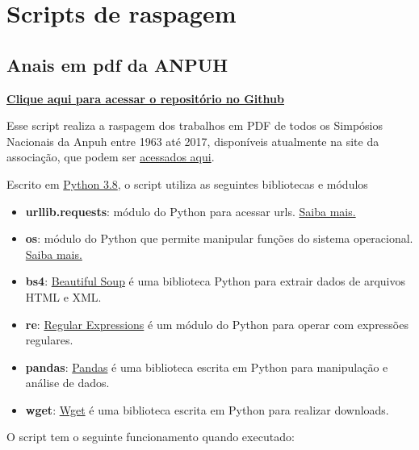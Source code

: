\documentclass[
]{book}
\providecommand{\tightlist}{%
  \setlength{\itemsep}{0pt}\setlength{\parskip}{0pt}}
\begin{document}
\hypertarget{scripts-de-raspagem}{%
\section{Scripts de raspagem}\label{scripts-de-raspagem}}

\hypertarget{anais-em-pdf-da-anpuh}{%
\subsection{Anais em pdf da ANPUH}\label{anais-em-pdf-da-anpuh}}

\href{https://github.com/LABHDUFBA/Anais-Anpuh}{\textbf{Clique aqui para acessar o repositório no Github}}

Esse script realiza a raspagem dos trabalhos em PDF de todos os Simpósios Nacionais da Anpuh entre 1963 até 2017, disponíveis atualmente na site da associação, que podem ser \href{https://anpuh.org.br/index.php/documentos/anais}{acessados aqui}.

Escrito em \href{https://www.python.org/}{Python 3.8}, o script utiliza as seguintes bibliotecas e módulos

\begin{itemize}
\tightlist
\item
  \textbf{urllib.requests}: módulo do Python para acessar urls. \href{https://docs.python.org/pt-br/3/library/urllib.request.htmll}{Saiba mais.}
\item
  \textbf{os}: módulo do Python que permite manipular funções do sistema operacional. \href{https://docs.python.org/pt-br/3/library/os.html}{Saiba mais.}
\item
  \textbf{bs4}: \href{https://www.crummy.com/software/BeautifulSoup/bs4/doc/}{Beautiful Soup} é uma biblioteca Python para extrair dados de arquivos HTML e XML.
\item
  \textbf{re}: \href{https://docs.python.org/pt-br/3/library/re.html}{Regular Expressions} é um módulo do Python para operar com expressões regulares.
\item
  \textbf{pandas}: \href{https://pandas.pydata.org/}{Pandas} é uma biblioteca escrita em Python para manipulação e análise de dados.
\item
  \textbf{wget}: \href{https://pypi.org/project/wget/}{Wget} é uma biblioteca escrita em Python para realizar downloads.
\end{itemize}

O script tem o seguinte funcionamento quando executado:
\end{document}
